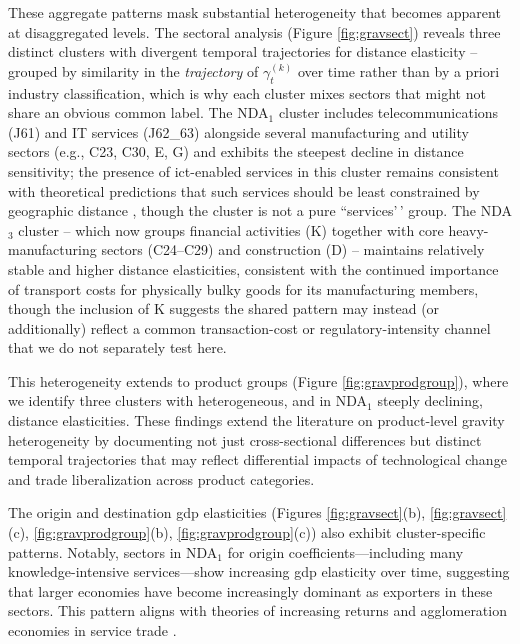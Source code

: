 \documentclass[preprint, 3p,
authoryear]{elsarticle} %
\begin{document}
These aggregate patterns mask substantial heterogeneity that becomes
apparent at disaggregated levels. The sectoral analysis (Figure
\ref{fig:gravsect}) reveals three distinct clusters with divergent
temporal trajectories for distance elasticity -- grouped by similarity
in the \emph{trajectory} of \(\gamma_t^{(k)}\) over time rather than by
a priori industry classification, which is why each cluster mixes
sectors that might not share an obvious common label. The NDA\(_1\)
cluster includes telecommunications (J61) and IT services (J62\_63)
alongside several manufacturing and utility sectors (e.g., C23, C30, E,
G) and exhibits the steepest decline in distance sensitivity; the
presence of \gls{ict}-enabled services in this cluster remains
consistent with theoretical predictions that such services should be
least constrained by geographic distance \citep{lendle2016}, though the
cluster is not a pure ``services'\,' group. The NDA\(_3\) cluster --
which now groups financial activities (K) together with core
heavy-manufacturing sectors (C24--C29) and construction (D) -- maintains
relatively stable and higher distance elasticities, consistent with the
continued importance of transport costs for physically bulky goods
\citep{hummels2005} for its manufacturing members, though the inclusion
of K suggests the shared pattern may instead (or additionally) reflect a
common transaction-cost or regulatory-intensity channel that we do not
separately test here.

This heterogeneity extends to product groups (Figure
\ref{fig:gravprodgroup}), where we identify three clusters with
heterogeneous, and in NDA\(_1\) steeply declining, distance
elasticities. These findings extend the literature on product-level
gravity heterogeneity \citep{berthelon2008, baldwinharrigan2011} by
documenting not just cross-sectional differences but distinct temporal
trajectories that may reflect differential impacts of technological
change and trade liberalization across product categories.

The origin and destination \gls{gdp} elasticities (Figures
\ref{fig:gravsect}(b), \ref{fig:gravsect}(c),
\ref{fig:gravprodgroup}(b), \ref{fig:gravprodgroup}(c)) also exhibit
cluster-specific patterns. Notably, sectors in NDA\(_1\) for origin
coefficients---including many knowledge-intensive services---show
increasing \gls{gdp} elasticity over time, suggesting that larger
economies have become increasingly dominant as exporters in these
sectors. This pattern aligns with theories of increasing returns and
agglomeration economies in service trade \citep{helpman2008}.
\end{document}
